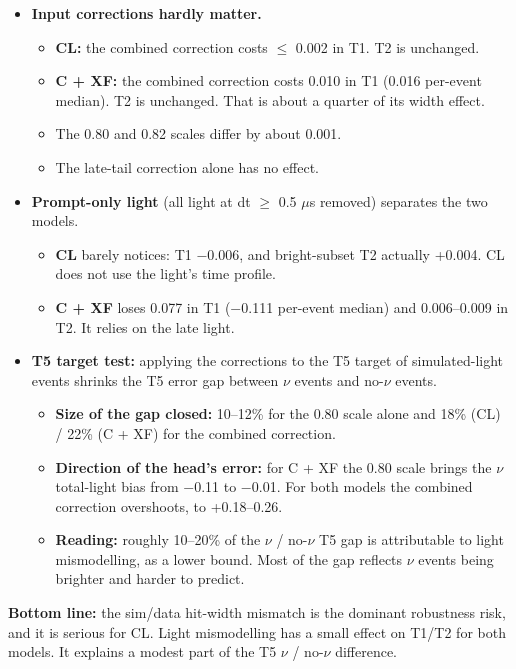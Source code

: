 \documentclass[10pt,a4paper]{article}
\begin{document}
\begin{itemize}
\item \textbf{Input corrections hardly matter.}
\begin{itemize}
\item \textbf{CL:} the combined correction costs $\leq$ 0.002 in T1. T2 is unchanged.
\item \textbf{C + XF:} the combined correction costs 0.010 in T1 (0.016 per-event median). T2 is unchanged. That is about a quarter of its width effect.
\item The 0.80 and 0.82 scales differ by about 0.001.
\item The late-tail correction alone has no effect.
\end{itemize}
\item \textbf{Prompt-only light} (all light at dt $\geq$ 0.5 $\mu$s removed) separates the two models.
\begin{itemize}
\item \textbf{CL} barely notices: T1 $-$0.006, and bright-subset T2 actually +0.004. CL does not use the light's time profile.
\item \textbf{C + XF} loses 0.077 in T1 ($-$0.111 per-event median) and 0.006--0.009 in T2. It relies on the late light.
\end{itemize}
\item \textbf{T5 target test:} applying the corrections to the T5 target of simulated-light events shrinks the T5 error gap between $\nu$ events and no-$\nu$ events.
\begin{itemize}
\item \textbf{Size of the gap closed:} 10--12\% for the 0.80 scale alone and 18\% (CL) / 22\% (C + XF) for the combined correction.
\item \textbf{Direction of the head's error:} for C + XF the 0.80 scale brings the $\nu$ total-light bias from $-$0.11 to $-$0.01. For both models the combined correction overshoots, to +0.18--0.26.
\item \textbf{Reading:} roughly 10--20\% of the $\nu$ / no-$\nu$ T5 gap is attributable to light mismodelling, as a lower bound. Most of the gap reflects $\nu$ events being brighter and harder to predict.
\end{itemize}
\end{itemize}
\textbf{Bottom line:} the sim/data hit-width mismatch is the dominant robustness risk, and it is serious for CL. Light mismodelling has a small effect on T1/T2 for both models. It explains a modest part of the T5 $\nu$ / no-$\nu$ difference.
\end{document}
